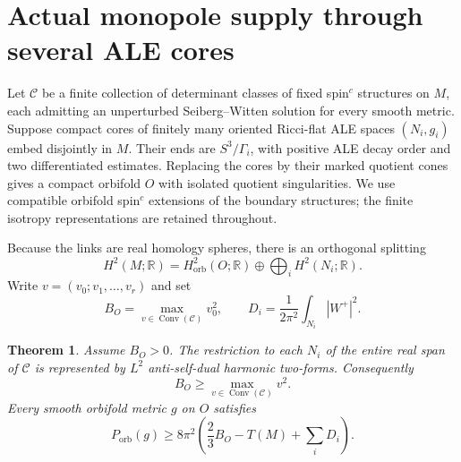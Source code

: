 \documentclass[11pt]{article}
\newtheorem{theorem}{Theorem}
\newcommand{\Conv}{\operatorname{Conv}}
\newcommand{\R}{\mathbb R}
\newcommand{\orb}{\mathrm{orb}}
\begin{document}
\section{Actual monopole supply through several ALE cores}
Let $\mathcal C$ be a finite collection of determinant classes of fixed
spin$^c$ structures on $M$, each admitting an unperturbed Seiberg--Witten
solution for every smooth metric. Suppose compact cores of finitely many
oriented Ricci-flat ALE spaces $(N_i,g_i)$ embed disjointly in $M$.
Their ends are $S^3/\Gamma_i$, with positive ALE decay order and two
differentiated estimates. Replacing the cores by their marked quotient cones
gives a compact orbifold $O$ with isolated quotient singularities.
We use compatible orbifold spin$^c$ extensions of the boundary structures;
the finite isotropy representations are retained throughout.

Because the links are real homology spheres, there is an orthogonal splitting
\[
H^2(M;\R)=H^2_{\orb}(O;\R)\oplus\bigoplus_i H^2(N_i;\R).
\]
Write $v=(v_0;v_1,\ldots,v_r)$ and set
\[
B_O=\max_{v\in\Conv(\mathcal C)}v_0^2,
\qquad D_i=\frac{1}{2\pi^2}\int_{N_i}|W^+|^2.
\]

\begin{theorem}\label{thm:transfer}
Assume $B_O>0$. The restriction to each $N_i$ of the entire real span of
$\mathcal C$ is represented by $L^2$ anti-self-dual harmonic two-forms.
Consequently
\begin{equation}
 B_O\ge\max_{v\in\Conv(\mathcal C)}v^2.
 \label{eq:convex}
\end{equation}
Every smooth orbifold metric $g$ on $O$ satisfies
\begin{equation}
\boxed{P_{\orb}(g)\ge8\pi^2\left(\frac23 B_O-T(M)+\sum_iD_i\right).}
\label{eq:main}
\end{equation}
\end{theorem}
\end{document}

